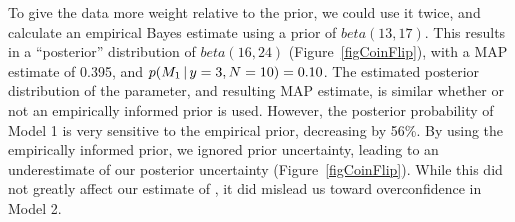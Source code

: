 \documentclass[letterpaper,12pt]{article}
\begin{document}
\begin{linenumbers}
To give the data more weight relative to the prior, we could use it twice, and
calculate an empirical Bayes estimate using a prior of $beta(13,17)$.  This
results in a ``posterior'' distribution of $beta(16, 24)$
(Figure~\ref{figCoinFlip}), with a MAP estimate of 0.395, and $p(M_1 \,|\,
y=3, N=10) = 0.10$.
The estimated posterior distribution of the parameter, and resulting MAP
estimate, is similar whether or not an empirically informed prior is used.
However, the posterior probability of Model 1 is very sensitive to the
empirical prior, decreasing by 56\%.
By using the empirically informed prior, we ignored prior uncertainty, leading
to an underestimate of our posterior uncertainty (Figure~\ref{figCoinFlip}).
While this did not greatly affect our estimate of \myTheta{}, it did mislead us
toward overconfidence in Model 2.




\end{linenumbers}
\end{document}
